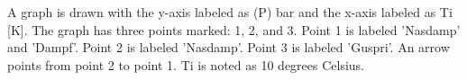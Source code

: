 A graph is drawn with the y-axis labeled as (P) bar and the x-axis labeled as Ti [K]. The graph has three points marked: 1, 2, and 3. Point 1 is labeled 'Nasdamp' and 'Dampf'. Point 2 is labeled 'Nasdamp'. Point 3 is labeled 'Guspri'. An arrow points from point 2 to point 1. Ti is noted as 10 degrees Celsius.